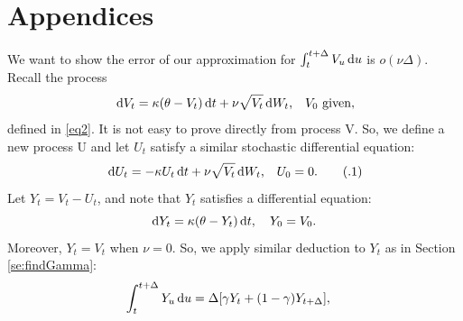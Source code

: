 \documentclass{ws-ijfe}
\newcommand\numberthis{\addtocounter{equation}{1}\tag{\theequation}}
\begin{document}

\appendix

\section{Appendices}
\label{sec:AppendixA}
We want to show the error of our approximation for $ \int_{t}^{t+\Delta}V_u\,\mathrm{d} u$ is $o(\nu\Delta)$. Recall the process
\begin{equation*}
  \,\mathrm{d} V_t = \kappa(\theta-V_t)\,\mathrm{d} t +\nu\sqrt{V_t}\,\mathrm{d} W_t\text{,} \quad V_0 \text{ given},
\end{equation*}
defined in \eqref{eq2}. It is not easy to prove directly from process V. So, we define a new process U and let $U_t$ satisfy a similar stochastic differential equation:
\begin{equation*}
  \,\d U_t = -\kappa U_t\,\d t + \nu\sqrt{V_t}\,\d W_t\text{,} \quad U_0 = 0.\numberthis\label{appeqnV_t}
\end{equation*}
Let $Y_t=V_t-U_t$, and note that $Y_t$ satisfies a differential equation:
\begin{equation*}
  \mathrm{d} Y_t = \kappa(\theta-Y_t)\,\mathrm{d} t, \quad Y_0 = V_0.
\end{equation*}
Moreover, $Y_t=V_t$ when $\nu = 0$. So, we apply similar deduction to $Y_t$ as in Section \ref{se:findGamma}:
\begin{align*}
   \int^{t+\Delta}_t Y_u\,\d u %
    &= \Delta[\gamma Y_t+(1-\gamma)Y_{t+\Delta}],
\end{align*}
\end{document}
